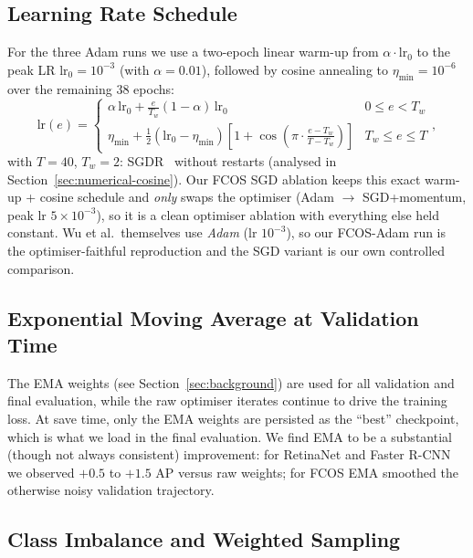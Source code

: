 \documentclass[11pt,a4paper]{article}
\begin{document}
\subsection{Learning Rate Schedule}

For the three Adam runs we use a two-epoch linear warm-up from $\alpha \cdot \text{lr}_0$ to the peak LR $\text{lr}_0 = 10^{-3}$ (with $\alpha = 0.01$), followed by cosine annealing to $\eta_{\min} = 10^{-6}$ over the remaining 38 epochs:
\begin{equation}
    \text{lr}(e) = \begin{cases}
        \alpha\,\text{lr}_0 + \tfrac{e}{T_w}(1 - \alpha)\,\text{lr}_0 & 0 \le e < T_w \\
        \eta_{\min} + \tfrac{1}{2}(\text{lr}_0 - \eta_{\min})\left[1 + \cos\!\left(\pi \cdot \tfrac{e - T_w}{T - T_w}\right)\right] & T_w \le e \le T
    \end{cases},
\end{equation}
with $T = 40$, $T_w = 2$: SGDR~\cite{loshchilov2017sgdr} without restarts (analysed in Section~\ref{sec:numerical-cosine}). Our FCOS SGD ablation keeps this exact warm-up + cosine schedule and \emph{only} swaps the optimiser (Adam $\rightarrow$ SGD+momentum, peak lr $5\times10^{-3}$), so it is a clean optimiser ablation with everything else held constant. Wu et al.\ themselves use \emph{Adam} (lr $10^{-3}$), so our FCOS-Adam run is the optimiser-faithful reproduction and the SGD variant is our own controlled comparison.

\subsection{Exponential Moving Average at Validation Time}

The EMA weights (see Section~\ref{sec:background}) are used for all validation and final evaluation, while the raw optimiser iterates continue to drive the training loss. At save time, only the EMA weights are persisted as the ``best'' checkpoint, which is what we load in the final evaluation. We find EMA to be a substantial (though not always consistent) improvement: for RetinaNet and Faster R-CNN we observed $+0.5$ to $+1.5$ AP versus raw weights; for FCOS EMA smoothed the otherwise noisy validation trajectory.

\subsection{Class Imbalance and Weighted Sampling}
\end{document}
